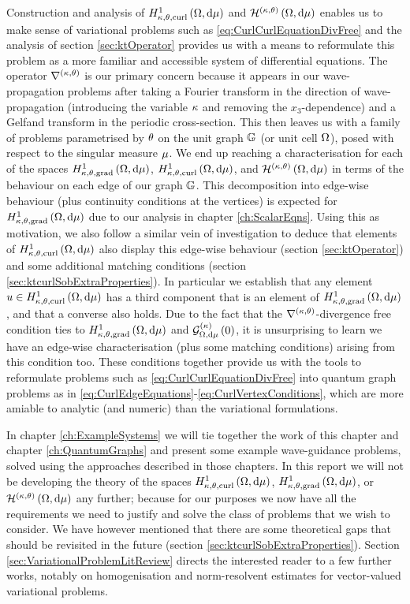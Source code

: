 Construction and analysis of $H^1_{\kappa,\theta,\mathrm{curl}}\left( \Omega, \mathrm{d}\mu \right)$ and $\mathcal{H}^{\left( \kappa, \theta \right)}\left( \Omega, \mathrm{d}\mu \right)$ enables us to make sense of variational problems such as \eqref{eq:CurlCurlEquationDivFree} and the analysis of section \ref{sec:ktOperator} provides us with a means to reformulate this problem as a more familiar and accessible system of differential equations.
The operator $\nabla^{\left( \kappa, \theta \right)}$ is our primary concern because it appears in our wave-propagation problems after taking a Fourier transform in the direction of wave-propagation (introducing the variable $\kappa$ and removing the $x_3$-dependence) and a Gelfand transform in the periodic cross-section.
This then leaves us with a family of problems parametrised by $\theta$ on the unit graph $\mathbb{G}$ (or unit cell $\Omega$), posed with respect to the singular measure $\mu$.
We end up reaching a characterisation for each of the spaces $H^1_{\kappa,\theta,\mathrm{grad}}\left( \Omega, \mathrm{d}\mu \right)$, $H^1_{\kappa,\theta,\mathrm{curl}}\left( \Omega, \mathrm{d}\mu \right)$, and $\mathcal{H}^{\left( \kappa, \theta \right)}\left( \Omega, \mathrm{d}\mu \right)$ in terms of the behaviour on each edge of our graph $\mathbb{G}$.
This decomposition into edge-wise behaviour (plus continuity conditions at the vertices) is expected for $H^1_{\kappa,\theta,\mathrm{grad}}\left( \Omega, \mathrm{d}\mu \right)$ due to our analysis in chapter \ref{ch:ScalarEqns}.
Using this as motivation, we also follow a similar vein of investigation to deduce that elements of $H^1_{\kappa,\theta,\mathrm{curl}}\left( \Omega, \mathrm{d}\mu \right)$ also display this edge-wise behaviour (section \ref{sec:ktOperator}) and some additional matching conditions (section \ref{sec:ktcurlSobExtraProperties}).
In particular we establish that any element $u\in H^1_{\kappa,\theta,\mathrm{curl}}\left( \Omega, \mathrm{d}\mu \right)$ has a third component that is an element of $H^1_{\kappa,\theta,\mathrm{grad}}\left( \Omega, \mathrm{d}\mu \right)$, and that a converse also holds.
Due to the fact that the $\nabla^{\left( \kappa, \theta \right)}$-divergence free condition ties to $H^1_{\kappa,\theta,\mathrm{grad}}\left( \Omega, \mathrm{d}\mu \right)$ and $\mathcal{G}_{ \Omega, \mathrm{d}\mu}^{(\kappa)}\left( 0 \right)$, it is unsurprising to learn we have an edge-wise characterisation (plus some matching conditions) arising from this condition too.
These conditions together provide us with the tools to reformulate problems such as \eqref{eq:CurlCurlEquationDivFree} into quantum graph problems as in \eqref{eq:CurlEdgeEquations}-\eqref{eq:CurlVertexConditions}, which are more amiable to analytic (and numeric) than the variational formulations. \newline

In chapter \ref{ch:ExampleSystems} we will tie together the work of this chapter and chapter \ref{ch:QuantumGraphs} and present some example wave-guidance problems, solved using the approaches described in those chapters.
In this report we will not be developing the theory of the spaces $H^1_{\kappa,\theta,\mathrm{curl}}\left( \Omega, \mathrm{d}\mu \right)$, $H^1_{\kappa,\theta,\mathrm{grad}}\left( \Omega, \mathrm{d}\mu \right)$, or $\mathcal{H}^{\left( \kappa, \theta \right)}\left( \Omega, \mathrm{d}\mu \right)$ any further; because for our purposes we now have all the requirements we need to justify and solve the class of problems that we wish to consider.
We have however mentioned that there are some theoretical gaps that should be revisited in the future (section \ref{sec:ktcurlSobExtraProperties}).
Section \ref{sec:VariationalProblemLitReview} directs the interested reader to a few further works, notably on homogenisation and norm-resolvent estimates for vector-valued variational problems.